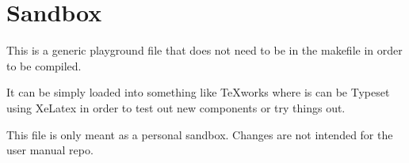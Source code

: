 



\section{Sandbox}

\megasymbol[red] This is a generic playground file that does not need to be in the makefile in order to be compiled. \megasymbol[blue]

It can be simply loaded into something like TeXworks where is can be Typeset using XeLatex in order to test out new components or try things out.

This file is only meant as a personal sandbox. Changes are not intended for the user manual repo. 

\megasymbolkey
{} 



